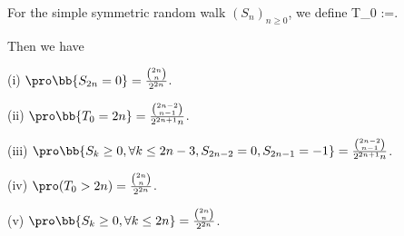 \begin{proposition}
For the simple symmetric random walk $(S_n)_{n\geq 0}$, we define
\be
T_0 :=\inf{}.
\ee

Then we have
\ben
\item [(i)] $\pro\bb{S_{2n}=0} =  \frac{\binom{2n}{n}}{2^{2n}}$.
\item [(ii)] $\pro\bb{T_0 = 2n} = \frac{\binom{2n-2}{n-1}}{2^{2n+1}n}$.
\item [(iii)] $\pro\bb{S_k\geq 0,\forall k\leq 2n-3, S_{2n-2} =0, S_{2n-1}=-1} = \frac{\binom{2n-2}{n-1}}{2^{2n+1}n}$.
\item [(iv)] $\pro(T_0>2n) = \frac{\binom{2n}{n}}{2^{2n}}$.
\item [(v)] $\pro\bb{S_k\geq 0, \forall k\leq 2n} = \frac{\binom{2n}{n}}{2^{2n}}$.
\een
\end{proposition}

